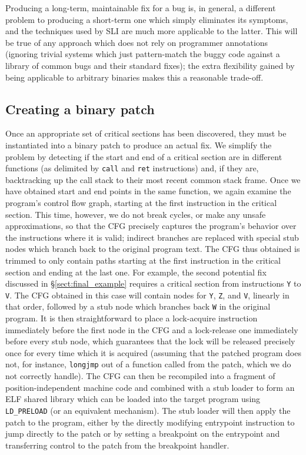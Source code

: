 \documentclass[10pt,twocolumn,preprint,natbib,authoryear]{sigplanconf}
\begin{document}
Producing a long-term, maintainable fix for a bug is, in general, a
different problem to producing a short-term one which simply
eliminates its symptoms, and the techniques used by SLI are much more
applicable to the latter.  This will be true of any approach which
does not rely on programmer annotations (ignoring trivial systems
which just pattern-match the buggy code against a library of common
bugs and their standard fixes); the extra flexibility gained by being
applicable to arbitrary binaries makes this a reasonable trade-off.

\subsection{Creating a binary patch}
\label{sect:binpatch}

Once an appropriate set of critical sections has been discovered, they
must be instantiated into a binary patch to produce an actual fix.  We
simplify the problem by detecting if the start and end of a critical
section are in different functions (as delimited by \verb|call| and
\verb|ret| instructions) and, if they are, backtracking up the call
stack to their most recent common stack frame.  Once we have obtained
start and end points in the same function, we again examine the
program's control flow graph, starting at the first instruction in the
critical section.  This time, however, we do not break cycles, or make
any unsafe approximations, so that the CFG precisely captures the
program's behavior over the instructions where it is valid; indirect
branches are replaced with special stub nodes which branch back to the
original program text.  The CFG thus obtained is trimmed to only
contain paths starting at the first instruction in the critical
section and ending at the last one.  For example, the second potential
fix discussed in \S\ref{sect:final_example} requires a critical
section from instructions \verb|Y| to \verb|V|.  The CFG obtained in
this case will contain nodes for \verb|Y|, \verb|Z|, and \verb|V|,
linearly in that order, followed by a stub node which branches back
\verb|W| in the original program.  It is then straightforward to place
a lock-acquire instruction immediately before the first node in the
CFG and a lock-release one immediately before every stub node, which
guarantees that the lock will be released precisely once for every
time which it is acquired (assuming that the patched program does not,
for instance, \verb|longjmp| out of a function called from the patch,
which we do not correctly handle).  The CFG can then be recompiled
into a fragment of position-independent machine code and combined with
a stub loader to form an ELF shared library which can be loaded into
the target program using \verb|LD_PRELOAD| (or an equivalent
mechanism).  The stub loader will then apply the patch to the program,
either by the directly modifying entrypoint instruction to jump
directly to the patch or by setting a breakpoint on the entrypoint and
transferring control to the patch from the breakpoint handler.
\end{document}
